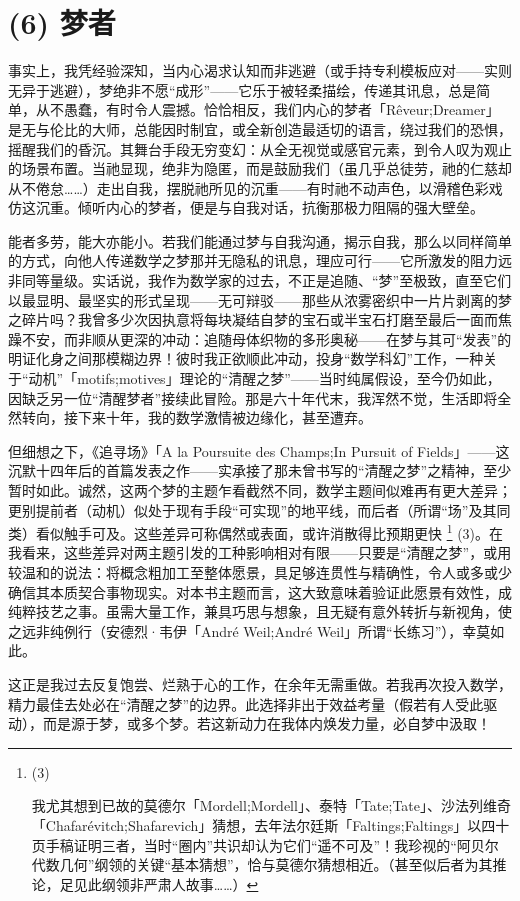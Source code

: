 \section{(6) 梦者}

事实上，我凭经验深知，当内心渴求认知而非逃避（或手持专利模板应对——实则无异于逃避），梦绝非不愿“成形”——它乐于被轻柔描绘，传递其讯息，总是简单，从不愚蠢，有时令人震撼。恰恰相反，我们内心的梦者「Rêveur;Dreamer」是无与伦比的大师，总能因时制宜，或全新创造最适切的语言，绕过我们的恐惧，摇醒我们的昏沉。其舞台手段无穷变幻：从全无视觉或感官元素，到令人叹为观止的场景布置。当祂显现，绝非为隐匿，而是鼓励我们（虽几乎总徒劳，祂的仁慈却从不倦怠……）走出自我，摆脱祂所见的沉重——有时祂不动声色，以滑稽色彩戏仿这沉重。倾听内心的梦者，便是与自我对话，抗衡那极力阻隔的强大壁垒。

能者多劳，能大亦能小。若我们能通过梦与自我沟通，揭示自我，那么以同样简单的方式，向他人传递数学之梦那并无隐私的讯息，理应可行——它所激发的阻力远非同等量级。实话说，我作为数学家的过去，不正是追随、“梦”至极致，直至它们以最显明、最坚实的形式呈现——无可辩驳——那些从浓雾密织中一片片剥离的梦之碎片吗？我曾多少次因执意将每块凝结自梦的宝石或半宝石打磨至最后一面而焦躁不安，而非顺从更深的冲动：追随母体织物的多形奥秘——在梦与其可“发表”的明证化身之间那模糊边界！彼时我正欲顺此冲动，投身“数学科幻”工作，一种关于“动机”「motifs;motives」理论的“清醒之梦”——当时纯属假设，至今仍如此，因缺乏另一位“清醒梦者”接续此冒险。那是六十年代末，我浑然不觉，生活即将全然转向，接下来十年，我的数学激情被边缘化，甚至遭弃。

但细想之下，《追寻场》「A la Poursuite des Champs;In Pursuit of Fields」——这沉默十四年后的首篇发表之作——实承接了那未曾书写的“清醒之梦”之精神，至少暂时如此。诚然，这两个梦的主题乍看截然不同，数学主题间似难再有更大差异；更别提前者（动机）似处于现有手段“可实现”的地平线，而后者（所谓“场”及其同类）看似触手可及。这些差异可称偶然或表面，或许消散得比预期更快 \footnote{(3)\par 我尤其想到已故的莫德尔「Mordell;Mordell」、泰特「Tate;Tate」、沙法列维奇「Chafarévitch;Shafarevich」猜想，去年法尔廷斯「Faltings;Faltings」以四十页手稿证明三者，当时“圈内”共识却认为它们“遥不可及”！我珍视的“阿贝尔代数几何”纲领的关键“基本猜想”，恰与莫德尔猜想相近。（甚至似后者为其推论，足见此纲领非严肃人故事……）} (3)。在我看来，这些差异对两主题引发的工种影响相对有限——只要是“清醒之梦”，或用较温和的说法：将概念粗加工至整体愿景，具足够连贯性与精确性，令人或多或少确信其本质契合事物现实。对本书主题而言，这大致意味着验证此愿景有效性，成纯粹技艺之事。虽需大量工作，兼具巧思与想象，且无疑有意外转折与新视角，使之远非纯例行（安德烈·韦伊「André Weil;André Weil」所谓“长练习”），幸莫如此。

这正是我过去反复饱尝、烂熟于心的工作，在余年无需重做。若我再次投入数学，精力最佳去处必在“清醒之梦”的边界。此选择非出于效益考量（假若有人受此驱动），而是源于梦，或多个梦。若这新动力在我体内焕发力量，必自梦中汲取！